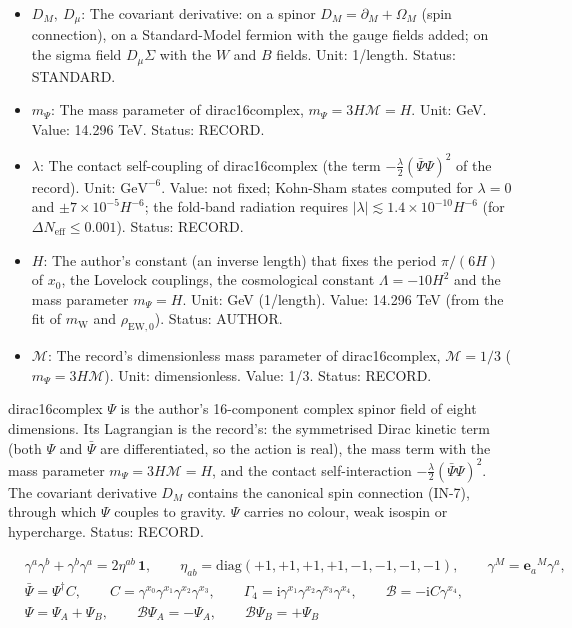 \documentclass[
  10pt,
]{article}
\begin{document}
\begin{itemize}
  copy \(M_1, M_2, \dots\)): it runs over \(x_0, x_1, \dots, x_7\); a
  repeated index is summed. Status: STANDARD.
\item
  \(D_M,\ D_\mu\): The covariant derivative: on a spinor
  \(D_M = \partial_M + \Omega_M\) (spin connection), on a Standard-Model
  fermion with the gauge fields added; on the sigma field
  \(D_\mu\Sigma\) with the \(W\) and \(B\) fields. Unit: 1/length.
  Status: STANDARD.
\item
  \(m_\Psi\): The mass parameter of dirac16complex,
  \(m_\Psi = 3H\mathcal{M} = H\). Unit: GeV. Value: 14.296 TeV. Status:
  RECORD.
\item
  \(\lambda\): The contact self-coupling of dirac16complex (the term
  \(-\frac{\lambda}{2}(\bar\Psi\Psi)^2\) of the record). Unit:
  \(\mathrm{GeV}^{-6}\). Value: not fixed; Kohn-Sham states computed for
  \(\lambda = 0\) and \(\pm7\times10^{-5}H^{-6}\); the fold-band
  radiation requires
  \(\lvert\lambda\rvert \lesssim 1.4\times10^{-10}H^{-6}\) (for
  \(\Delta N_{\mathrm{eff}} \le 0.001\)). Status: RECORD.
\item
  \(H\): The author's constant (an inverse length) that fixes the period
  \(\pi/(6H)\) of \(x_0\), the Lovelock couplings, the cosmological
  constant \(\Lambda = -10H^2\) and the mass parameter \(m_\Psi = H\).
  Unit: GeV (1/length). Value: 14.296 TeV (from the fit of
  \(m_{\mathrm{W}}\) and \(\rho_{\mathrm{EW},0}\)). Status: AUTHOR.
\item
  \(\mathcal{M}\): The record's dimensionless mass parameter of
  dirac16complex, \(\mathcal{M} = 1/3\) (\(m_\Psi = 3H\mathcal{M}\)).
  Unit: dimensionless. Value: 1/3. Status: RECORD.
\end{itemize}

dirac16complex \(\Psi\) is the author's 16-component complex spinor
field of eight dimensions. Its Lagrangian is the record's: the
symmetrised Dirac kinetic term (both \(\Psi\) and \(\bar\Psi\) are
differentiated, so the action is real), the mass term with the mass
parameter \(m_\Psi = 3H\mathcal{M} = H\), and the contact
self-interaction \(-\frac{\lambda}{2}(\bar\Psi\Psi)^2\). The covariant
derivative \(D_M\) contains the canonical spin connection (IN-7),
through which \(\Psi\) couples to gravity. \(\Psi\) carries no colour,
weak isospin or hypercharge. Status: RECORD.

\[
\begin{aligned}
&\gamma^a\gamma^b + \gamma^b\gamma^a = 2\eta^{ab}\,\mathbf{1},\qquad
 \eta_{ab} = \mathrm{diag}(+1, +1, +1, +1, -1, -1, -1, -1),\qquad \gamma^M = \mathbf{e}_a{}^M\gamma^a,\\
&\bar\Psi = \Psi^\dagger C,\qquad C = \gamma^{x_0}\gamma^{x_1}\gamma^{x_2}\gamma^{x_3},\qquad
 \Gamma_4 = \mathrm{i}\gamma^{x_1}\gamma^{x_2}\gamma^{x_3}\gamma^{x_4},\qquad \mathcal{B} =
 -\mathrm{i}C\gamma^{x_4},\\
&\Psi = \Psi_A + \Psi_B,\qquad \mathcal{B}\Psi_A = -\Psi_A,\qquad \mathcal{B}\Psi_B = +\Psi_B
\end{aligned} \tag{IN-6}
\]
\end{document}
